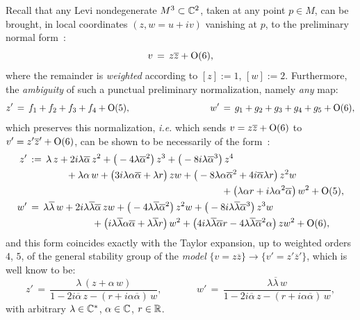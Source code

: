 \documentclass[12pt,twoside,leqno,openany]{amsart}
\begin{document}
Recall that any Levi nondegenerate $M^3 \subset \mathbb{C}^2$, taken
at any point $p \in M$, can be brought, in local coordinates
$(z, w = u + iv)$ vanishing at $p$, to the preliminary normal
form~{\cite[Prp.~2.2]{Merker-2020}}:
\[
v
\,=\,
z\overline{z}
+
{\rm O}(6),
\]
where 
the remainder is {\sl weighted} according to
$[z] := 1$, $[w] := 2$.
Furthermore, the {\sl ambiguity} of such a
punctual preliminary normalization, namely {\em any}
map:
\[
z'
\,=\,
f_1+f_2+f_3+f_4
+
{\rm O}(5),
\ \ \ \ \ \ \ \ \ \ \ \ \ \ \ \ \ \ \ \ \ \ \ \ \ \
w'
\,=\,
g_1+g_2+g_3+g_4+g_5
+
{\rm O}(6),
\]
which preserves this normalization, {\em i.e.} which sends
$v = z\overline{z} + {\rm O}(6)$ to 
$v' = z' \overline{z}' + {\rm O}(6)$, can be shown
to be necessarily of the form~{\cite[Prp.~2.4]{Merker-2020}}:
\[
\aligned
z'
&
\,:=\,
\lambda\,z
+
2i\lambda\overline{\alpha}\,
z^2
+
\big(
-4\lambda\overline{\alpha}^2
\big)\,
z^3
+
\big(
-8i\lambda\overline{\alpha}^3
\big)\,
z^4
\\
&
\ \ \ \ \ \ \ \ \ \ \ \
+
\lambda\alpha\,
w
+
\big(
3i\lambda\alpha\overline{\alpha}
+
\lambda r
\big)\,
zw
+
\big(
-8\lambda\alpha\overline{\alpha}^2
+
4i\overline{\alpha}\lambda r
\big)\,
z^2w
\notag
\\
&
\ \ \ \ \ \ \ \ \ \ \ \ \ \ \ \ \ \ \ \ \ \ \ \ \ \ \ \ \ \ \ \ \ \ 
\ \ \ \ \ \ \ \ \ \ \ \ \ \ \ \ \ \ \ \ \ \ \ \ \ \
+
\big(
\lambda\alpha r
+
i\lambda\alpha^2\overline{\alpha}
\big)\,
w^2
+
{\rm O}(5),
\\
w'
&
\,=\,
\lambda\overline{\lambda}\,
w
+
2i\lambda\overline{\lambda}\overline{\alpha}\,
zw
+
\big(
-4\lambda\overline{\lambda}\overline{\alpha}^2
\big)\,
z^2w
+
\big(
-8i\lambda\overline{\lambda}\overline{\alpha}^3
\big)\,
z^3w
\notag
\\
&
\ \ \ \ \ \ \ \ \ \ \ \ \ \ \ \ \ \ \ \
+
\big(
i\lambda\overline{\lambda}\alpha\overline{\alpha}
+
\lambda\overline{\lambda}r
\big)\,
w^2
+
\big(
4i\lambda\overline{\lambda}\overline{\alpha}r
-
4\lambda\overline{\lambda}\overline{\alpha}^2\alpha
\big)\,
zw^2
+
{\rm O}(6),
\endaligned
\]
and this form 
coincides exactly with the Taylor expansion, up to 
weighted orders $4$, $5$, of the general stability group
of the {\em model} $\{v = z \overline{z}\} \longrightarrow 
\{ v' = z'\overline{z}' \}$, which is well know to be:
\[
z'
\,=\,
\frac{\lambda\,(z+\alpha\,w)}{
1-2i\overline{\alpha}\,z
-
(r+i\alpha\overline{\alpha})\,w},
\ \ \ \ \ \ \ \ \ \ \ \ \ \ \ \ 
w'
\,=\,
\frac{\lambda\overline{\lambda}\,w}{
1-2i\overline{\alpha}\,z
-
(r+i\alpha\overline{\alpha})\,w},
\]
with arbitrary $\lambda \in \mathbb{C}^\ast$, $\alpha \in \mathbb{C}$, $r \in \mathbb{R}$.
\end{document}
